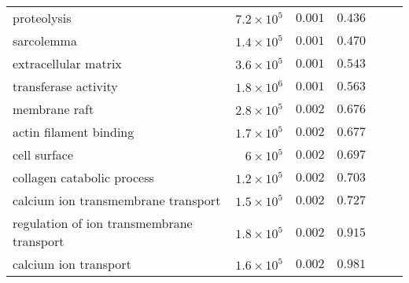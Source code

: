\begin{longtable}{|l|r|r|r|r|r|}
    proteolysis                               & $7.2\times 10^{5}$ & $ 0.001$             & $ 0.436~~$                      \\
    sarcolemma                                & $1.4\times 10^{5}$ & $ 0.001$             & $ 0.470~~$                      \\
    extracellular matrix                      & $3.6\times 10^{5}$ & $ 0.001$             & $ 0.543~~$                      \\
    transferase activity                      & $1.8\times 10^{6}$ & $ 0.001$             & $ 0.563~~$                      \\
    membrane raft                             & $2.8\times 10^{5}$ & $ 0.002$             & $ 0.676~~$                      \\
    actin filament binding                    & $1.7\times 10^{5}$ & $ 0.002$             & $ 0.677~~$                      \\
    cell surface                              & $ 6\times 10^{5}$  & $ 0.002$             & $ 0.697~~$                      \\
    collagen catabolic process                & $1.2\times 10^{5}$ & $ 0.002$             & $ 0.703~~$                      \\
    calcium ion transmembrane transport       & $1.5\times 10^{5}$ & $ 0.002$             & $ 0.727~~$                      \\
    regulation of ion transmembrane transport & $1.8\times 10^{5}$ & $ 0.002$             & $ 0.915~~$                      \\
    calcium ion transport                     & $1.6\times 10^{5}$ & $ 0.002$             & $ 0.981~~$                      \\
\end{longtable}
